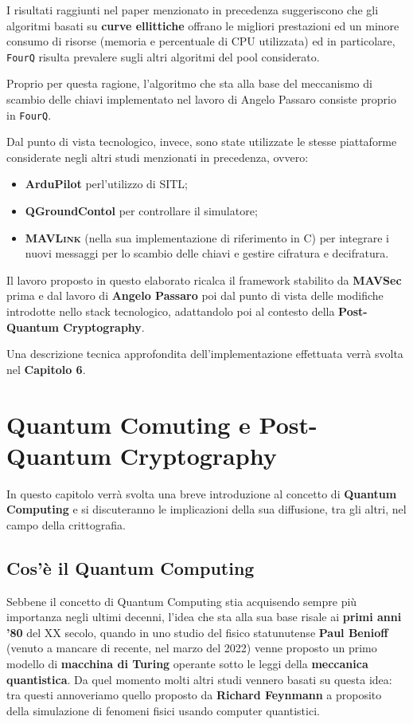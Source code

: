 \documentclass[a4paper, 12pt, oneside]{article}
\theoremstyle{definition}
\begin{document}
I risultati raggiunti nel paper menzionato in precedenza suggeriscono che gli algoritmi basati su \textbf{curve ellittiche} offrano le migliori prestazioni ed un minore consumo di risorse (memoria e percentuale di CPU utilizzata) ed in particolare, \texttt{FourQ} risulta prevalere sugli altri algoritmi del pool considerato.

Proprio per questa ragione, l'algoritmo che sta alla base del meccanismo di scambio delle chiavi implementato nel lavoro di Angelo Passaro consiste proprio in \texttt{FourQ}.

Dal punto di vista tecnologico, invece, sono state utilizzate le stesse piattaforme considerate negli altri studi menzionati in precedenza, ovvero:

\begin{itemize}
    \item \textbf{ArduPilot} perl'utilizzo di SITL;
    \item \textbf{QGroundContol} per controllare il simulatore;
    \item \textbf{\textsc{MAVLink}} (nella sua implementazione di riferimento in C) per integrare i nuovi messaggi per lo scambio delle chiavi e gestire cifratura e decifratura.
\end{itemize}

Il lavoro proposto in questo elaborato ricalca il framework stabilito da \textbf{MAVSec} prima e dal lavoro di \textbf{Angelo Passaro} poi dal punto di vista delle modifiche introdotte nello stack tecnologico, adattandolo poi al contesto della \textbf{Post-Quantum Cryptography}. 

Una descrizione tecnica approfondita dell'implementazione effettuata verrà svolta nel \textbf{Capitolo 6}.

\newpage
\section{Quantum Comuting e Post-Quantum Cryptography}
In questo capitolo verrà svolta una breve introduzione al concetto di \textbf{Quantum Computing} e si discuteranno le implicazioni della sua diffusione, tra gli altri, nel campo della crittografia.

\subsection{Cos'è il Quantum Computing}
Sebbene il concetto di Quantum Computing stia acquisendo sempre più importanza negli ultimi decenni, l'idea che sta alla sua base risale ai \textbf{primi anni '80} del XX secolo, quando in uno studio \cite{Benioff1980} del fisico statunutense \textbf{Paul Benioff} (venuto a mancare di recente, nel marzo del 2022) venne proposto un primo modello di \textbf{macchina di Turing} operante sotto le leggi della \textbf{meccanica quantistica}. Da quel momento molti altri studi vennero basati su questa idea: tra questi annoveriamo quello proposto da \textbf{Richard Feynmann} a proposito della simulazione di fenomeni fisici usando computer quantistici.
\end{document}
